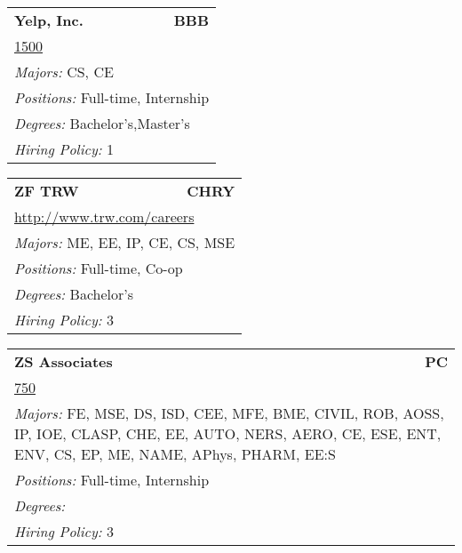 \documentclass[twoside]{article}
\begin{document}
\begin{center}
\begin{multicols}{3}
\begin{FlushLeft}
\begin{minipage}{\columnwidth}
\end{minipage}
 
\begin{minipage}{\columnwidth}\begin{tabularx}{.95\columnwidth}{Xr}
                 {\Large\bf Yelp, Inc.} & {\Large\bf BBB}\\
    \multicolumn{2}{p{.95\columnwidth}}{\url{1500}}\\
    \multicolumn{2}{p{.95\columnwidth}}{\emph{Majors:} CS, CE}\\
    \multicolumn{2}{p{.95\columnwidth}}{\emph{Positions:} Full-time, Internship}\\
    \multicolumn{2}{p{.95\columnwidth}}{\emph{Degrees:} Bachelor's,Master's}\\
    \multicolumn{2}{p{.95\columnwidth}}{\emph{Hiring Policy:} 1}\\
    \end{tabularx}
    
\end{minipage}
 
\begin{minipage}{\columnwidth}\begin{tabularx}{.95\columnwidth}{Xr}
                 {\Large\bf ZF TRW} & {\Large\bf CHRY}\\
    \multicolumn{2}{p{.95\columnwidth}}{\url{http://www.trw.com/careers}}\\
    \multicolumn{2}{p{.95\columnwidth}}{\emph{Majors:} ME, EE, IP, CE, CS, MSE}\\
    \multicolumn{2}{p{.95\columnwidth}}{\emph{Positions:} Full-time, Co-op}\\
    \multicolumn{2}{p{.95\columnwidth}}{\emph{Degrees:} Bachelor's}\\
    \multicolumn{2}{p{.95\columnwidth}}{\emph{Hiring Policy:} 3}\\
    \end{tabularx}
    
\end{minipage}
 
\begin{minipage}{\columnwidth}\begin{tabularx}{.95\columnwidth}{Xr}
                 {\Large\bf ZS Associates} & {\Large\bf PC}\\
    \multicolumn{2}{p{.95\columnwidth}}{\url{750}}\\
    \multicolumn{2}{p{.95\columnwidth}}{\emph{Majors:} FE, MSE, DS, ISD, CEE, MFE, BME, CIVIL, ROB, AOSS, IP, IOE, CLASP, CHE, EE, AUTO, NERS, AERO, CE, ESE, ENT, ENV, CS, EP, ME, NAME, APhys, PHARM, EE:S}\\
    \multicolumn{2}{p{.95\columnwidth}}{\emph{Positions:} Full-time, Internship}\\
    \multicolumn{2}{p{.95\columnwidth}}{\emph{Degrees:} }\\
    \multicolumn{2}{p{.95\columnwidth}}{\emph{Hiring Policy:} 3}\\
    \end{tabularx}
    

\end{minipage}
\end{FlushLeft}
\end{multicols}
\end{center}
\end{document}
